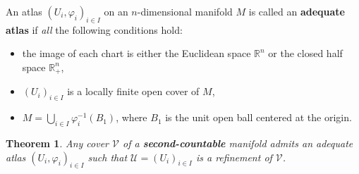 \documentclass[12pt, letterpaper]{article}
\newcommand{\re}{\mathbb{R}}
\newtheorem{thm}[prop]{Theorem}
\theoremstyle{definition}
\theoremstyle{remark}
\theoremstyle{definition}
\theoremstyle{plain}
\numberwithin{equation}{section}
\begin{document}
	\begin{def*}
		An atlas $\left(U_{i},\varphi _{i}\right)_{i\in I}$ on an $n$-dimensional manifold $M$ is called an \textbf{adequate atlas}
		if \textit{all} the following conditions hold:
		\begin{itemize}
			\item the image of each chart is either the Euclidean space $\re ^{n}$ or the closed half space $ \re _{+}^{n}$,
			\item $\left(U_{i}\right)_{i\in I}$ is a locally finite open cover of $M$,
			\item $M=\bigcup _{i\in I}\varphi _{i}^{-1}\left(B_{1}\right)$, where $B_{1}$ is the unit open ball centered at the origin.
		\end{itemize}
	\end{def*}	
	
	\begin{thm}
		Any cover $\mathcal{V}$ of a \textbf{second-countable} manifold admits an adequate atlas $(U_i,\varphi_i)_{i\in I}$
		such that $\mathcal{U}=(U_i)_{i\in I}$ is a refinement of $\mathcal{V}$.
	\end{thm}
\end{document}
